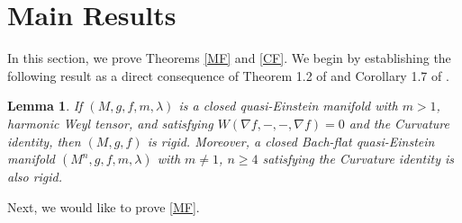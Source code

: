 \documentclass[12pt]{amsart}
\newtheorem{lemma}[theorem]{Lemma}
\theoremstyle{definition}
\numberwithin{equation}{section}
\begin{document}
\section{Main Results}
\noindent 
In this section, we prove Theorems \ref{MF} and \ref{CF}. We begin by establishing the following result as a direct consequence of Theorem 1.2 of \cite{CPW} and Corollary 1.7 of \cite{CQ}.
\begin{lemma}
If $(M,g,f,m,\lambda)$ is a closed quasi-Einstein manifold with $m > 1$, harmonic Weyl tensor, and satisfying $W(\nabla f, -,- ,\nabla f) = 0$ and the Curvature identity, then $(M,g,f)$ is rigid. Moreover, a closed Bach-flat quasi-Einstein manifold $(M^{n},g,f,m,\lambda)$ with $m \neq 1$, $n \geq 4$ satisfying the Curvature identity is also rigid.
\end{lemma}
Next, we would like to prove \cref{MF}.
\end{document}
